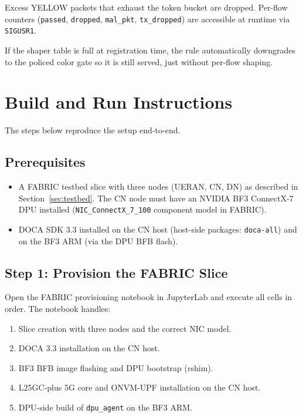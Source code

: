 \documentclass[conference]{IEEEtran}
\newcommand{\code}[1]{\nolinkurl{#1}}
\begin{document}
Excess YELLOW packets that exhaust the token bucket are dropped.  Per-flow
counters (\code{passed}, \code{dropped}, \code{mal_pkt},
\code{tx_dropped}) are accessible at runtime via \code{SIGUSR1}.

If the shaper table is full at registration time, the rule
automatically downgrades to the policed color gate so it is still
served, just without per-flow shaping.

\section{Build and Run Instructions}
\label{sec:build}

The steps below reproduce the setup end-to-end.

\subsection{Prerequisites}

\begin{itemize}
  \item A FABRIC testbed slice with three nodes (UERAN, CN, DN) as
        described in Section~\ref{sec:testbed}.  The CN node must have
        an NVIDIA BF3 ConnectX-7 DPU installed
        (\texttt{NIC\_ConnectX\_7\_100} component model in FABRIC).
  \item DOCA SDK 3.3 installed on the CN host (host-side packages:
        \texttt{doca-all}) and on the BF3 ARM (via the DPU BFB flash).
\end{itemize}

\subsection{Step 1: Provision the FABRIC Slice}

Open the FABRIC provisioning notebook
in JupyterLab and execute all cells in order.  The notebook handles:
\begin{enumerate}
  \item Slice creation with three nodes and the correct NIC model.
  \item DOCA 3.3 installation on the CN host.
  \item BF3 BFB image flashing and DPU bootstrap (rshim).
  \item L25GC-plus 5G core and ONVM-UPF installation on the CN host.
  \item DPU-side build of \code{dpu_agent} on the BF3 ARM.
\end{enumerate}
\end{document}
